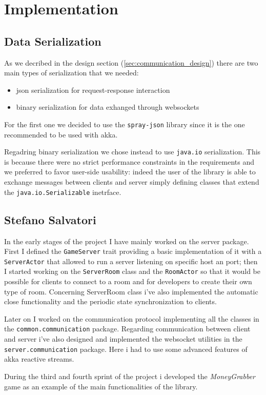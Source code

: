\chapter{Implementation}
\section{Data Serialization}
As we decribed in the design section (\ref{sec:communication_design}) there are two main types of serialization that we needed:
\begin{itemize}
	\item json serialization for request-response interaction
	\item binary serialization for  data exhanged through websockets
\end{itemize}

For the first one we decided to use the \texttt{spray-json} library since it is the one recommended to be used with akka.

Regadring binary serialization we chose instead to use \texttt{java.io} serialization. This is because there were no strict performance constraints in the requirements and we preferred to favor user-side usability: indeed the user of the library is able to exchange messages between clients and server simply defining classes that extend the \texttt{java.io.Serializable} inetrface.



\section{Stefano Salvatori}
In the early stages of the project I have mainly worked on the server package. First I defined the \texttt{GameServer} trait providing a basic implementation of it with a \texttt{ServerActor} that allowed to run a server listening on specific host an port; then I started working on the \texttt{ServerRoom} class and the \texttt{RoomActor} so that it would be possible for clients to connect to a room and for developers to create their own type of room. Concerning ServerRoom class i've also implemented the automatic close functionality and the periodic state synchronization to clients.

Later on I worked on the communication protocol implementing all the classes in the \texttt{common.communication} package. Regarding communication between client and server i've also designed and implemented the websocket utilities in the \texttt{server.communication} package. Here i had to use some advanced features of akka reactive streams. 

During the third and fourth sprint of the project i developed the \textit{MoneyGrabber} game as an example of the main functionalities of the library. 